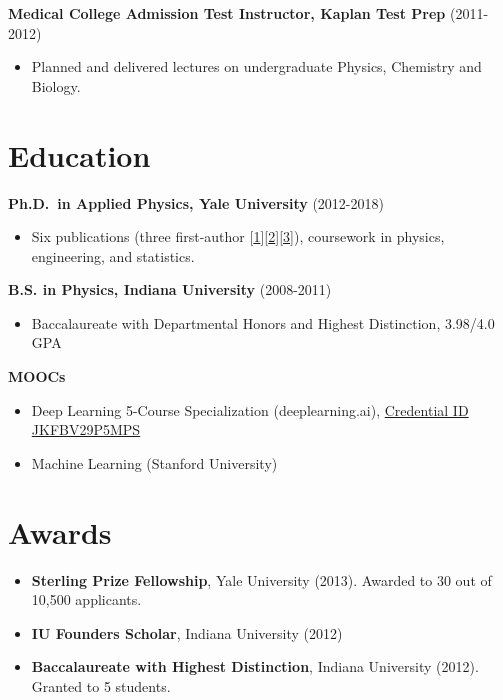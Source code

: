 \documentclass[
]{report}
\providecommand{\tightlist}{%
  \setlength{\itemsep}{0pt}\setlength{\parskip}{0pt}}\usepackage{longtable,booktabs,array}
\begin{document}
\textbf{Medical College Admission Test Instructor, Kaplan Test Prep}
(2011-2012)

\begin{itemize}
\tightlist
\item
  Planned and delivered lectures on undergraduate Physics, Chemistry and
  Biology.
\end{itemize}

\hypertarget{education}{%
\section{Education}\label{education}}

\textbf{Ph.D.~in Applied Physics, Yale University} (2012-2018)

\begin{itemize}
\tightlist
\item
  Six publications (three first-author
  {[}\href{https://journals.aps.org/prb/abstract/10.1103/PhysRevB.99.054304}{1}{]}{[}\href{https://aip.scitation.org/doi/abs/10.1063/1.5051638}{2}{]}{[}\href{https://iopscience.iop.org/article/10.1088/1361-6528/aae673/meta}{3}{]}),
  coursework in physics, engineering, and statistics.
\end{itemize}

\textbf{B.S. in Physics, Indiana University} (2008-2011)

\begin{itemize}
\tightlist
\item
  Baccalaureate with Departmental Honors and Highest Distinction,
  3.98/4.0 GPA
\end{itemize}

\textbf{MOOCs}

\begin{itemize}
\tightlist
\item
  Deep Learning 5-Course Specialization (deeplearning.ai),
  \href{https://www.coursera.org/account/accomplishments/specialization/JKFBV29P5MPS}{Credential
  ID JKFBV29P5MPS}
\item
  Machine Learning (Stanford University)
\end{itemize}

\hypertarget{awards}{%
\section{Awards}\label{awards}}

\begin{itemize}
\tightlist
\item
  \textbf{Sterling Prize Fellowship}, Yale University (2013). Awarded to
  30 out of 10,500 applicants.
\item
  \textbf{IU Founders Scholar}, Indiana University (2012)
\item
  \textbf{Baccalaureate with Highest Distinction}, Indiana University
  (2012). Granted to 5 students.
\end{itemize}
\end{document}
